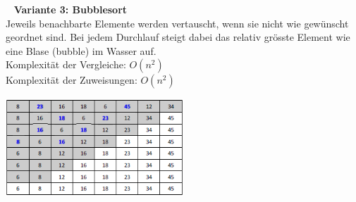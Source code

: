 \ \newline
\textbf{Variante 3: Bubblesort}\\
Jeweils benachbarte Elemente werden vertauscht, wenn sie nicht wie gewünscht geordnet sind. Bei jedem Durchlauf steigt dabei das relativ grösste Element wie eine Blase (bubble) im Wasser auf.\\
Komplexität der Vergleiche: $O(n^2)$\\
Komplexität der Zuweisungen: $O(n^2)$\\
\begin{multicols}{2}

\includegraphics[width=0.5\textwidth]{images/Algorithmen/Bubblesort.png}
\end{multicols}

